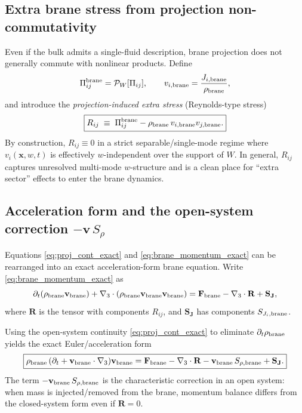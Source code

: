 \documentclass[11pt]{article}
\begin{document}
\subsection{Extra brane stress from projection non-commutativity}
\label{app:extra_stress}

Even if the bulk admits a single-fluid description, brane projection does not
generally commute with nonlinear products. Define
\begin{equation}
\Pi^{\rm brane}_{ij} = \mathcal{P}_W[\Pi_{ij}],
\qquad
v_{i,{\rm brane}}=\frac{J_{i,{\rm brane}}}{\rho_{\rm brane}},
\label{eq:Pi_brane_and_v}
\end{equation}
and introduce the \emph{projection-induced extra stress} (Reynolds-type stress)
\begin{equation}
\boxed{
R_{ij}
\;\equiv\;
\Pi^{\rm brane}_{ij} - \rho_{\rm brane}\, v_{i,{\rm brane}} v_{j,{\rm brane}}.
}
\label{eq:app_Rij_def_alt}
\end{equation}
By construction, $R_{ij}\equiv 0$ in a strict separable/single-mode regime where
$v_i(\mathbf{x},w,t)$ is effectively $w$-independent over the support of $W$.
In general, $R_{ij}$ captures unresolved multi-mode $w$-structure and is a
clean place for ``extra sector'' effects to enter the brane dynamics.

\subsection{Acceleration form and the open-system correction \texorpdfstring{$-\mathbf{v}\,S_\rho$}{-v S\_rho}}
\label{app:euler_form_open_system}

Equations \eqref{eq:proj_cont_exact} and \eqref{eq:brane_momentum_exact} can be rearranged
into an exact acceleration-form brane equation. Write \eqref{eq:brane_momentum_exact} as
\begin{equation}
\partial_t(\rho_{\rm brane}\mathbf{v}_{\rm brane}) + \nabla_3\cdot(\rho_{\rm brane}\mathbf{v}_{\rm brane}\mathbf{v}_{\rm brane})
=
\mathbf{F}_{\rm brane} - \nabla_3\cdot \mathbf{R} + \mathbf{S}_{\mathbf{J}},
\label{eq:momentum_with_R}
\end{equation}
where $\mathbf{R}$ is the tensor with components $R_{ij}$, and $\mathbf{S}_{\mathbf{J}}$ has components $S_{J_i,{\rm brane}}$.

Using the open-system continuity \eqref{eq:proj_cont_exact} to eliminate $\partial_t\rho_{\rm brane}$
yields the exact Euler/acceleration form
\begin{equation}
\boxed{
\rho_{\rm brane}\,(\partial_t+\mathbf{v}_{\rm brane}\cdot\nabla_3)\mathbf{v}_{\rm brane}
=
\mathbf{F}_{\rm brane}
-\nabla_3\cdot \mathbf{R}
-\mathbf{v}_{\rm brane}\,S_{\rho,{\rm brane}}
+\mathbf{S}_{\mathbf{J}}.
}
\label{eq:brane_euler_open_system}
\end{equation}
The term $-\mathbf{v}_{\rm brane}\,S_{\rho,{\rm brane}}$ is the characteristic correction
in an open system: when mass is injected/removed from the brane, momentum balance differs
from the closed-system form even if $\mathbf{R}=0$.
\end{document}
